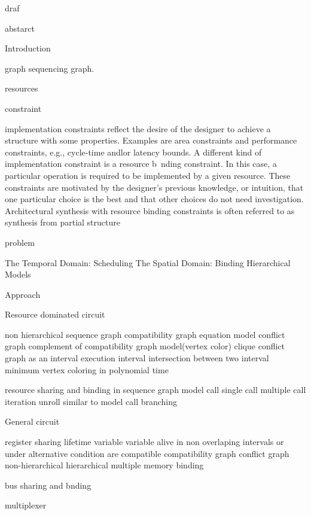 draf

abstarct

Introduction

graph
	sequencing graph. 

resources 

constraint
	
		implementation constraints reflect the desire of the designer to achieve a structure with some properties. Examples are 	area constraints and performance constraints, e.g., cycle-time andlor latency bounds. A different kind of implementation constraint is a resource b~nding constraint. In this case, a particular operation is required to be implemented by a given resource. 
These constraints are motivated by the designer's previous knowledge, or intuition, that one particular choice is the best and that other choices do not need investigation. Architectural synthesis with resource binding constraints is often referred to as synthesis from partial structure


problem
	
	The Temporal Domain: Scheduling
	The Spatial Domain: Binding 
	Hierarchical Models 

Approach


Resource dominated circuit

	non hierarchical sequence graph
		compatibility graph
			equation
			model
		conflict graph
			complement of compatibility graph
			model(vertex color)
			clique
		conflict graph as an interval
			execution interval
			intersection between two interval
			minimum vertex coloring in polynomial time
		
	resource sharing and binding in sequence graph
		model call
			single call
			multiple call
		iteration
			unroll
			similar to model call
		branching
		
		
		
General circuit

	register sharing
		lifetime variable
		variable alive in non overlaping intervals or under alternative condition are compatible
		compatibility graph
		conflict graph
		non-hierarchical
		hierarchical
	multiple memory binding
	
	bus sharing and bnding
	
	multiplexer
	
	